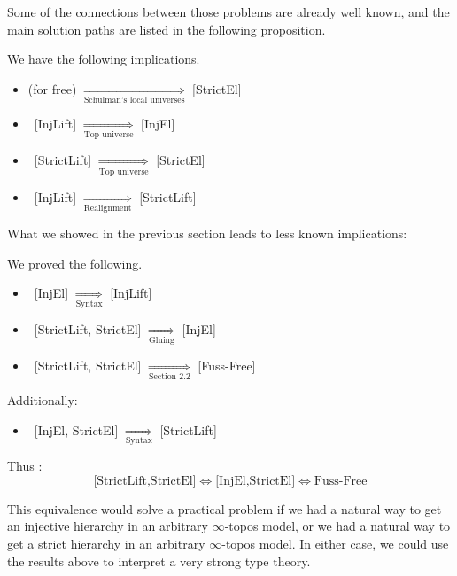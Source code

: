 \documentclass{article}
\begin{document}
Some of the connections between those problems are already well known, and the main
solution paths are listed in the following proposition.

\begin{proposition} We have the following implications.
    \begin{itemize}
        \item (for free) $\underset{\text{Schulman's local universes}}{\Longrightarrow}$ [StrictEl]

        \item\ [InjLift] $\underset{\text{Top universe}}{\Longrightarrow}$ [InjEl]
        \item\ [StrictLift] $\underset{\text{Top universe}}{\Longrightarrow}$ [StrictEl]
        \item\ [InjLift] $\underset{\text{Realignment}}{\Longrightarrow}$ [StrictLift]
    \end{itemize}
\end{proposition}

What we showed in the previous section leads to less known implications:


\begin{proposition} We proved the following.
    \begin{itemize}
        \item\ [InjEl] $\underset{\text{Syntax}}{\Longrightarrow}$ [InjLift]
        \item\ [StrictLift, StrictEl] $\underset{\text{Gluing}}{\Longrightarrow}$ [InjEl]
        \item\ [StrictLift, StrictEl] $\underset{\text{Section } 2.2}{\Longrightarrow}$ [Fuss-Free]
    \end{itemize}

    Additionally:

    \begin{itemize}
        \item\ [InjEl, StrictEl] $\underset{\text{Syntax}}{\Longrightarrow}$ [StrictLift]
    \end{itemize}

    Thus : 
    \[ \text{[StrictLift,StrictEl]} \Longleftrightarrow \text{[InjEl,StrictEl]} \Longleftrightarrow \text{Fuss-Free}\]
\end{proposition}

This equivalence would solve a practical problem if we had a natural way to get an injective hierarchy
in an arbitrary $\infty$-topos model, or we had a natural way to get a strict hierarchy in an
arbitrary $\infty$-topos model. In either case, we could use the results above to interpret
a very strong type theory.\\
\end{document}
